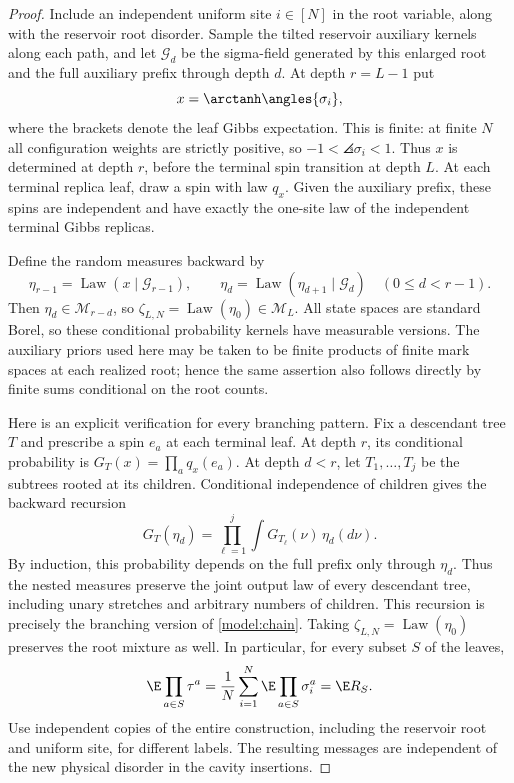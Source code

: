 \begin{proof}
Include an independent uniform site $i\in[N]$ in the root variable, along
with the reservoir root disorder. Sample the tilted reservoir auxiliary
kernels along each path, and let $\mathscr G_d$ be the sigma-field generated
by this enlarged root and the full auxiliary prefix through depth $d$.
At depth $r=L-1$ put
\[
 x=\arctanh\angles{\sigma_i},
\]
where the brackets denote the leaf Gibbs expectation. This is finite:
at finite $N$ all configuration weights are strictly positive, so
$-1<\angles{\sigma_i}<1$.
Thus $x$ is determined at depth $r$, before the terminal spin transition
at depth $L$. At each terminal replica leaf, draw a spin with law $q_x$. Given the
auxiliary prefix, these spins are independent and have exactly the
one-site law of the independent terminal Gibbs replicas.

Define the random measures backward by
\[
 \eta_{r-1}=\operatorname{Law}(x\mid\mathscr G_{r-1}),\qquad
 \eta_d=\operatorname{Law}(\eta_{d+1}\mid\mathscr G_d)
 \quad(0\le d<r-1).
\]
Then $\eta_d\in\mathcal M_{r-d}$, so
$\zeta_{L,N}=\operatorname{Law}(\eta_0)\in\mathcal M_L$.
All state spaces are standard
Borel, so these conditional probability kernels have measurable versions.
The auxiliary priors used here may be taken to be finite products of finite
mark spaces at each realized root; hence the same assertion also follows
directly by finite sums conditional on the root counts.

Here is an explicit verification for every branching pattern. Fix a
descendant tree $T$ and prescribe a spin $e_a$ at each terminal leaf.
At depth $r$, its conditional probability is
$G_T(x)=\prod_a q_x(e_a)$. At depth $d<r$, let $T_1,\ldots,T_j$ be
the subtrees rooted at its children. Conditional independence of children
gives the backward recursion
\[
 G_T(\eta_d)=\prod_{\ell=1}^j
       \int G_{T_\ell}(\nu)\,\eta_d(d\nu).
\]
By induction, this probability depends on the full prefix only through
$\eta_d$. Thus the nested measures preserve the joint output law of every
descendant tree, including unary stretches and arbitrary numbers of
children. This recursion is precisely the branching version of
\eqref{model:chain}. Taking $\zeta_{L,N}=\operatorname{Law}(\eta_0)$
preserves the root mixture as well. In particular, for every subset $S$
of the leaves,
\begin{equation}\label{comp:single-label-moments}
 \E\prod_{a\in S}\tau^a
 =\frac1N\sum_{i=1}^N\E\prod_{a\in S}\sigma_i^a
 =\E R_S.
\end{equation}
Use independent copies of the entire construction, including the reservoir
root and uniform site, for different labels. The resulting messages are
independent of the new physical disorder in the cavity insertions.
\end{proof}

